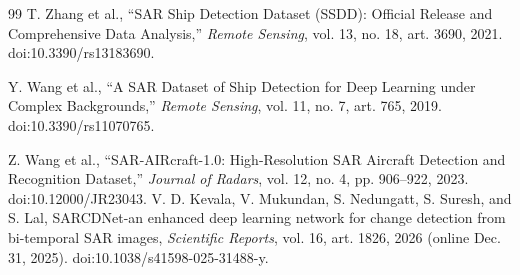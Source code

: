 \documentclass[journal]{IEEEtran}
\begin{document}
\begin{thebibliography}{99}
T. Zhang et al., ``SAR Ship Detection Dataset (SSDD): Official Release and Comprehensive Data Analysis,'' \emph{Remote Sensing}, vol. 13, no. 18, art. 3690, 2021. doi:10.3390/rs13183690.

Y. Wang et al., ``A SAR Dataset of Ship Detection for Deep Learning under Complex Backgrounds,'' \emph{Remote Sensing}, vol. 11, no. 7, art. 765, 2019. doi:10.3390/rs11070765.

Z. Wang et al., ``SAR-AIRcraft-1.0: High-Resolution SAR Aircraft Detection and Recognition Dataset,'' \emph{Journal of Radars}, vol. 12, no. 4, pp. 906--922, 2023. doi:10.12000/JR23043.
V. D. Kevala, V. Mukundan, S. Nedungatt, S. Suresh, and S. Lal, SARCDNet-an enhanced deep learning network for change detection from bi-temporal SAR images, \emph{Scientific Reports}, vol. 16, art. 1826, 2026 (online Dec. 31, 2025). doi:10.1038/s41598-025-31488-y.
\end{thebibliography}
\end{document}
